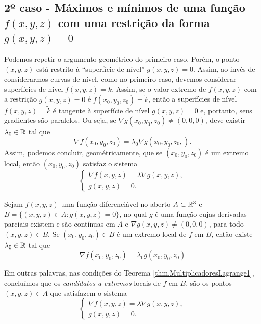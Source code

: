 \subsection{2º caso - Máximos e mínimos de uma função \texorpdfstring{\(f(x,y,z)\)}{f(x,y,z)} com uma restrição da forma \texorpdfstring{\(g(x,y,z) = 0\)}{g(x,y,z)=0}}

Podemos repetir o argumento geométrico do primeiro caso. Porém, o ponto \((x,y,z)\) está restrito à ``superfície de nível'' \(g(x,y,z) = 0\). Assim, ao invés de considerarmos curvas de nível, como no primeiro caso, devemos considerar superfícies de nível \(f(x,y,z) = k\). Assim, se o valor extremo de \(f(x,y,z)\) com a restrição \(g(x,y,z) = 0\) é \(f(x_0,y_0,z_0) = \tilde{k}\), então a superfícies de nível \(f(x,y,z) = \tilde{k}\) é tangente à superfície de nível \(g(x,y,z) = 0\) e, portanto, seus gradientes são paralelos. Ou seja, se \(\nabla g(x_0,y_0,z_0)\neq (0,0,0)\), deve existir \(\lambda_0\in\mathbb{R}\) tal que \[\nabla f(x_0,y_0,z_0) = \lambda_0 \nabla g(x_0,y_0,z_0,).\] Assim, podemos concluir, geométricamente, que se \((x_0,y_0,z_0)\) é um extremo local, então \((x_0,y_0,z_0)\) satisfaz o sistema \[\begin{cases}
    \nabla f(x,y,z) = \lambda \nabla g(x,y,z), \\
    g(x,y,z) = 0.
\end{cases}\]

\begin{theorem}\label{thm.MultiplicadoresLagrange1}
    Sejam \(f(x,y,z)\) uma função diferenciável no aberto \(A\subset\mathbb{R}^3\) e \(B = \{(x,y,z)\in A: g(x,y,z) = 0\}\), no qual \(g\) é uma função cujas derivadas parciais existem e são contínuas em \(A\) e \(\nabla g(x,y,z) \neq (0,0,0)\), para todo \((x,y,z)\in B\). Se \((x_0,y_0,z_0)\in B\) é um extremo local de \(f\) em \(B\), então existe \(\lambda_0\in\mathbb{R}\) tal que \[\nabla f(x_0,y_0,z_0) = \lambda_0 g(x_0,y_0,z_0)\]
\end{theorem}

Em outras palavras, nas condições do Teorema \ref{thm.MultiplicadoresLagrange1}, concluímos que os \textit{candidatos a extremos} locais de \(f\) em \(B\), são os pontos \((x,y,z)\in A\) que satisfazem o sistema \[\begin{cases}
    \nabla f(x,y,z) = \lambda \nabla g(x,y,z), \\
    g(x,y,z) = 0.
\end{cases}\]

